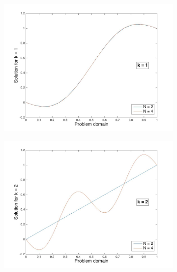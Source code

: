 \documentclass[10pt]{article}
\begin{document}
\begin{figure}[H]
\centering
\begin{subfigure}{.35\textwidth}
  \centering
  \includegraphics[width=1.0\linewidth]{Nplot_for_k_1.jpg}
  \caption{}
\end{subfigure}
\begin{subfigure}{.35\textwidth}
  \centering
  \includegraphics[width=1.0\linewidth]{Nplot_for_k_2.jpg}
  \caption{}
\end{subfigure}
\begin{subfigure}{.35\textwidth}
  \centering

\end{subfigure}
\end{figure}
\end{document}
